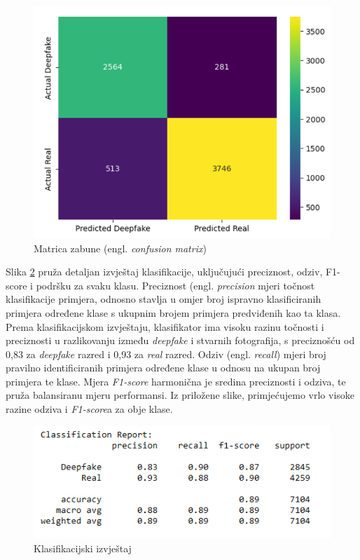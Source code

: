 \documentclass[seminarski, times, utf8]{fer}
\begin{document}
\begin{figure}[H]
   \centering
   \includegraphics[width=0.7\linewidth]{slike/matrica.png}
   \caption{Matrica zabune (engl. \textit{confusion matrix})}
   \label{fig:matrica}
\end{figure}

Slika \ref{fig:report} pruža detaljan izvještaj klasifikacije, uključujući preciznost, odziv, F1-score i podršku za svaku klasu. 
Preciznost (engl. \textit{precision} mjeri točnost klasifikacije primjera, odnosno stavlja u omjer broj ispravno klasificiranih primjera određene klase s ukupnim brojem primjera predviđenih kao ta klasa. Prema klasifikacijskom izvještaju, klasifikator ima visoku razinu točnosti i preciznosti u razlikovanju između \textit{deepfake} i stvarnih fotografija, s preciznošću od 0,83 za \textit{deepfake} razred i 0,93 za \textit{real} razred.
Odziv (engl. \textit{recall}) mjeri broj pravilno identificiranih primjera određene klase u odnosu na ukupan broj primjera te klase. Mjera \textit{F1-score} harmonična je sredina preciznosti i odziva, te pruža balansiranu mjeru performansi. Iz priložene slike, primjećujemo vrlo visoke razine odziva i \textit{F1-score}a za obje klase.

\begin{figure}[H]
   \centering
   \includegraphics[width=0.7\linewidth]{slike/report.png}
   \caption{Klasifikacijski izvještaj}
   \label{fig:report}
\end{figure}
\end{document}
